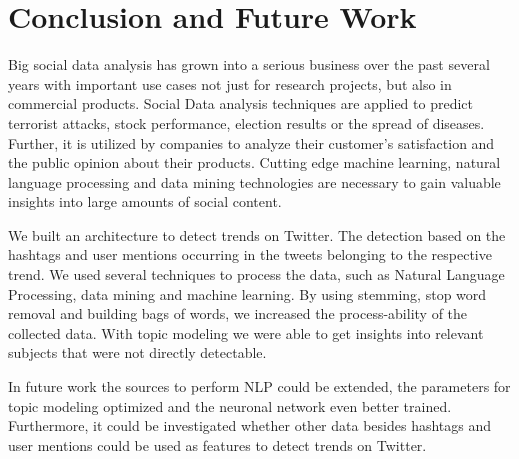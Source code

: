 
\chapter{Conclusion and Future Work}
\label{cha:conclusion-future-work}
Big social data analysis has grown into a serious business over the past several years with important use cases not just for research projects, but also in commercial products. Social Data analysis techniques are applied to predict terrorist attacks, stock performance, election results or the spread of diseases. Further, it is utilized by companies to analyze their customer’s satisfaction and the public opinion about their products. Cutting edge machine learning, natural language processing and data mining technologies are necessary to gain valuable insights into large amounts of social content.

We built an architecture to detect trends on Twitter. The detection based on the hashtags and user mentions occurring in the tweets belonging to the respective trend.
We used several techniques to process the data, such as Natural Language Processing, data mining and machine learning. By using stemming, stop word removal and building bags of words, we increased the process-ability of the collected data. With topic modeling we were able to get insights into relevant subjects that were not directly detectable. 

In future work the sources to perform NLP could be extended, the parameters for topic modeling optimized and the neuronal network even better trained. Furthermore, it could be investigated whether other data besides hashtags and user mentions could be used as features to detect trends on Twitter.